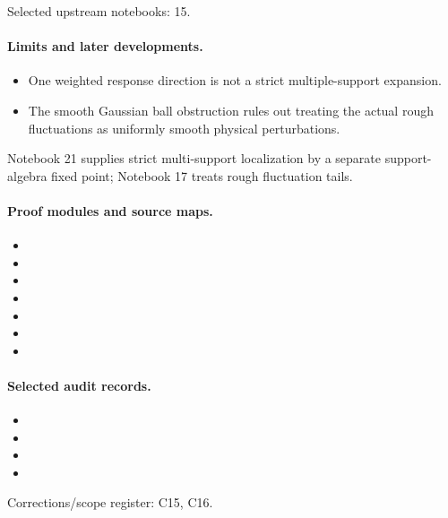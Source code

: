 \documentclass[11pt]{article}
\theoremstyle{remark}
\begin{document}
Selected upstream notebooks: 15.\par

\paragraph{Limits and later developments.}
\begin{itemize}
\item One weighted response direction is not a strict multiple-support expansion.
\item The smooth Gaussian ball obstruction rules out treating the actual rough fluctuations as uniformly smooth physical perturbations.
\end{itemize}

Notebook 21 supplies strict multi-support localization by a separate support-algebra fixed point; Notebook 17 treats rough fluctuation tails.

\paragraph{Proof modules and source maps.}
\begingroup\small
\begin{itemize}
\item {}
\item {}
\item {}
\item {}
\item {}
\item {}
\item {}
\end{itemize}
\endgroup

\paragraph{Selected audit records.}
\begingroup\small
\begin{itemize}
\item {}
\item {}
\item {}
\item {}
\end{itemize}
\endgroup
Corrections/scope register: C15, C16.\par
\end{document}
